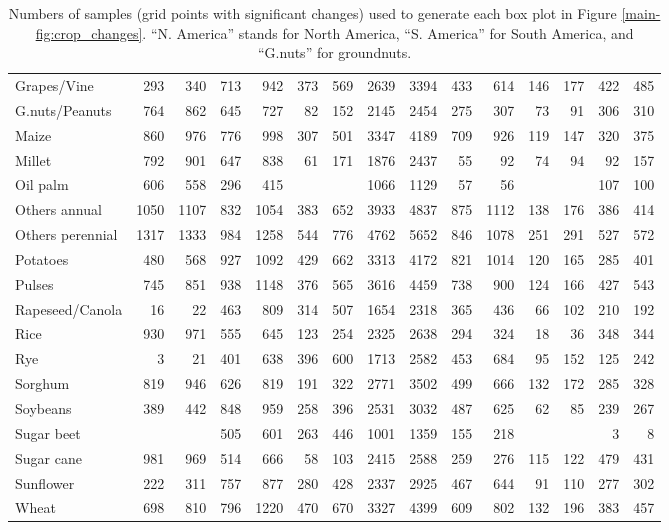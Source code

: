 \documentclass[pdflatex, sn-nature]{sn-jnl}\usepackage[]{graphicx}\usepackage[]{xcolor}
\begin{document}
\begin{table}
\begin{tabular}{lrrrrrrrrrrrrrr}
Grapes/Vine & 293 & 340 & 713 & 942 & 373 & 569 & 2639 & 3394 & 433 & 614 & 146 & 177 & 422 & 485 \\
G.nuts/Peanuts & 764 & 862 & 645 & 727 & 82 & 152 & 2145 & 2454 & 275 & 307 & 73 & 91 & 306 & 310 \\
Maize & 860 & 976 & 776 & 998 & 307 & 501 & 3347 & 4189 & 709 & 926 & 119 & 147 & 320 & 375 \\
Millet & 792 & 901 & 647 & 838 & 61 & 171 & 1876 & 2437 & 55 & 92 & 74 & 94 & 92 & 157 \\
Oil palm & 606 & 558 & 296 & 415 &  &  & 1066 & 1129 & 57 & 56 &  &  & 107 & 100 \\
Others annual & 1050 & 1107 & 832 & 1054 & 383 & 652 & 3933 & 4837 & 875 & 1112 & 138 & 176 & 386 & 414 \\
Others perennial & 1317 & 1333 & 984 & 1258 & 544 & 776 & 4762 & 5652 & 846 & 1078 & 251 & 291 & 527 & 572 \\
Potatoes & 480 & 568 & 927 & 1092 & 429 & 662 & 3313 & 4172 & 821 & 1014 & 120 & 165 & 285 & 401 \\
Pulses & 745 & 851 & 938 & 1148 & 376 & 565 & 3616 & 4459 & 738 & 900 & 124 & 166 & 427 & 543 \\
Rapeseed/Canola & 16 & 22 & 463 & 809 & 314 & 507 & 1654 & 2318 & 365 & 436 & 66 & 102 & 210 & 192 \\
Rice & 930 & 971 & 555 & 645 & 123 & 254 & 2325 & 2638 & 294 & 324 & 18 & 36 & 348 & 344 \\
Rye & 3 & 21 & 401 & 638 & 396 & 600 & 1713 & 2582 & 453 & 684 & 95 & 152 & 125 & 242 \\
Sorghum & 819 & 946 & 626 & 819 & 191 & 322 & 2771 & 3502 & 499 & 666 & 132 & 172 & 285 & 328 \\
Soybeans & 389 & 442 & 848 & 959 & 258 & 396 & 2531 & 3032 & 487 & 625 & 62 & 85 & 239 & 267 \\
Sugar beet &  &  & 505 & 601 & 263 & 446 & 1001 & 1359 & 155 & 218 &  &  & 3 & 8 \\
Sugar cane & 981 & 969 & 514 & 666 & 58 & 103 & 2415 & 2588 & 259 & 276 & 115 & 122 & 479 & 431 \\
Sunflower & 222 & 311 & 757 & 877 & 280 & 428 & 2337 & 2925 & 467 & 644 & 91 & 110 & 277 & 302 \\
Wheat & 698 & 810 & 796 & 1220 & 470 & 670 & 3327 & 4399 & 609 & 802 & 132 & 196 & 383 & 457 \\
\bottomrule
\end{tabular}

\caption{Numbers of samples (grid points with significant changes) used to
generate each box plot in Figure \ref{main-fig:crop_changes}. ``N. America''
stands for North America, ``S. America'' for South America, and ``G.nuts'' for
groundnuts.}
\label{tab:bar_ns}
\end{table}
\end{document}

